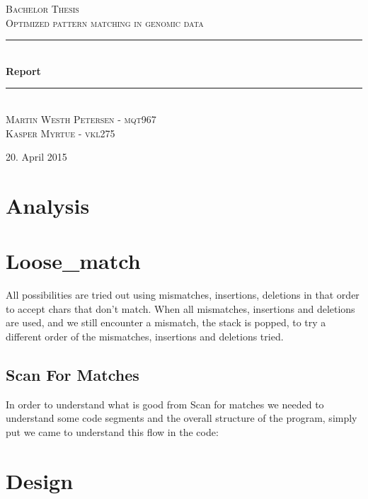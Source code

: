\documentclass[12pt]{article}
\newcommand{\HRule}{\rule{\linewidth}{0.5mm}}
\begin{document}
\begin{titlepage}
\begin{center}

\textsc{\Large Bachelor Thesis \\ Optimized pattern matching in genomic data\\[0.3cm]}
\HRule \\[0.4cm]
{ \LARGE \bfseries Report}\\[0.4cm]
\HRule \\[1.2cm]
\textsc{\large Martin Westh Petersen - mqt967 \\ Kasper Myrtue - vkl275}\\[1.0cm]
\end{center}
\begin{center}
\vfill
{\large 20. April 2015}
\end{center}
\end{titlepage}
\tableofcontents \newpage

\section{Analysis}
\section{Loose\_match}
All possibilities are tried out using mismatches, insertions, deletions in that order to accept chars that don't match.
When all mismatches, insertions and deletions are used, and we still encounter a mismatch, the stack is popped, to
try a different order of the mismatches, insertions and deletions tried.
\subsection{Scan For Matches}
In order to understand what is good from Scan for matches we needed to understand some code segments and the overall structure of the program, simply put we came to understand this flow in the code:

\section{Design}
\end{document}
